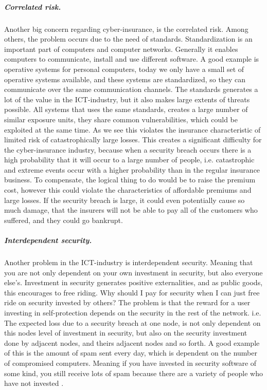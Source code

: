       
\subparagraph{Correlated risk.}

Another big concern regarding cyber-insurance, is the correlated risk. Among others, the problem occurs due to the need of standards. Standardization is an important part of computers and computer networks. Generally it enables computers to communicate, install and use different software. A good example is operative systems for personal computers, today we only have a small set of operative systems available, and these systems are standardized, so they can communicate over the same communication channels. The standards generates a lot of the value in the ICT-industry, but it also makes large extents of threats possible. All systems that uses the same standards, creates a large number of similar exposure units, they share common vulnerabilities, which could be exploited at the same time. As we see this violates the insurance characteristic of limited risk of catastrophically large losses.  
This creates a significant difficulty for the cyber-insurance industry, because when a security breach occurs there is a high probability that it will occur to a large number of people, i.e. catastrophic and extreme events occur with a higher probability than in the regular insurance business. To compensate, the logical thing to do would be to raise the premium cost, however this could violate the characteristics of affordable premiums and large losses. 
If the security breach is large, it could even potentially cause so much damage, that the insurers will not be able to pay all of the customers who suffered, and they could go bankrupt.\cite{bohme2010modeling}


\subparagraph{Interdependent security.}
Another problem in the ICT-industry is interdependent security. Meaning that you are not only dependent on your own investment in security, but also everyone else's. 
Investment in security generates positive externalities, and as public goods, this encourages to free riding. Why should I pay for security when I can just free ride on security invested by others? The problem is that the reward for a user investing in self-protection depends on the security in the rest of the network. i.e. The expected loss due to a security breach at one node, is not only dependent on this nodes level of investment in security, but also on the security investment done by adjacent nodes, and theirs adjacent nodes and so forth. A good example of this is the amount of spam sent every day, which is dependent on the number of compromised computers. Meaning if you have invested in security software of some kind, you still receive lots of spam because there are a variety of people who have not invested
 \cite{towardsInsurable}.
 
